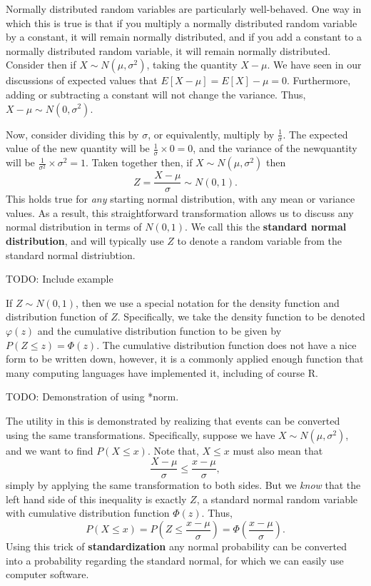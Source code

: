 \documentclass[
  letterpaper,
  DIV=11,
  numbers=noendperiod]{scrreprt}
\begin{document}
Normally distributed random variables are particularly well-behaved. One
way in which this is true is that if you multiply a normally distributed
random variable by a constant, it will remain normally distributed, and
if you add a constant to a normally distributed random variable, it will
remain normally distributed. Consider then if \(X\sim N(\mu,\sigma^2)\),
taking the quantity \(X - \mu\). We have seen in our discussions of
expected values that \(E[X-\mu] = E[X]-\mu = 0\). Furthermore, adding or
subtracting a constant will not change the variance. Thus,
\(X-\mu\sim N(0,\sigma^2)\).

Now, consider dividing this by \(\sigma\), or equivalently, multiply by
\(\frac{1}{\sigma}\). The expected value of the new quantity will be
\(\frac{1}{\sigma}\times 0 = 0\), and the variance of the newquantity
will be \(\frac{1}{\sigma^2}\times\sigma^2 = 1\). Taken together then,
if \(X\sim N(\mu,\sigma^2)\) then
\[Z = \frac{X - \mu}{\sigma} \sim N(0,1).\] This holds true for
\emph{any} starting normal distribution, with any mean or variance
values. As a result, this straightforward transformation allows us to
discuss any normal distribution in terms of \(N(0,1)\). We call this the
\textbf{standard normal distribution}, and will typically use \(Z\) to
denote a random variable from the standard normal distriubtion.

TODO: Include example

If \(Z\sim N(0,1)\), then we use a special notation for the density
function and distribution function of \(Z\). Specifically, we take the
density function to be denoted \(\varphi(z)\) and the cumulative
distribution function to be given by \(P(Z \leq z) = \Phi(z)\). The
cumulative distribution function does not have a nice form to be written
down, however, it is a commonly applied enough function that many
computing languages have implemented it, including of course R.

TODO: Demonstration of using *norm.

The utility in this is demonstrated by realizing that events can be
converted using the same transformations. Specifically, suppose we have
\(X \sim N(\mu,\sigma^2)\), and we want to find \(P(X \leq x)\). Note
that, \(X \leq x\) must also mean that
\[\frac{X-\mu}{\sigma} \leq \frac{x - \mu}{\sigma},\] simply by applying
the same transformation to both sides. But we \emph{know} that the left
hand side of this inequality is exactly \(Z\), a standard normal random
variable with cumulative distribution function \(\Phi(z)\). Thus,
\[P(X \leq x) = P\left(Z \leq \frac{x - \mu}{\sigma}\right) = \Phi\left(\frac{x-\mu}{\sigma}\right).\]
Using this trick of \textbf{standardization} any normal probability can
be converted into a probability regarding the standard normal, for which
we can easily use computer software.
\end{document}

